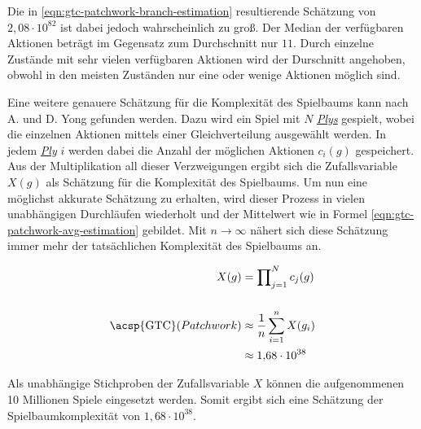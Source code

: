 Die in \ref{eqn:gtc-patchwork-branch-estimation} resultierende Schätzung von $2{,}08 \cdot 10^{82}$ ist dabei jedoch wahrscheinlich zu groß. Der Median der verfügbaren Aktionen beträgt im Gegensatz zum Durchschnitt nur $11$. Durch einzelne Zustände mit sehr vielen verfügbaren Aktionen wird der Durschnitt angehoben, obwohl in den meisten Zuständen nur eine oder wenige Aktionen möglich sind.

Eine weitere genauere Schätzung für die Komplexität des Spielbaums kann nach A. und D. Yong gefunden werden. Dazu wird ein Spiel mit $N$ \hyperref[text:ply]{\emph{Plys}} gespielt, wobei die einzelnen Aktionen mittels einer Gleichverteilung ausgewählt werden. In jedem \hyperref[text:ply]{\emph{Ply}} $i$ werden dabei die Anzahl der möglichen Aktionen $c_i(g)$ gespeichert. Aus der Multiplikation all dieser Verzweigungen ergibt sich die Zufallsvariable $X(g)$ als Schätzung für die Komplexität des Spielbaums. Um nun eine möglichst akkurate Schätzung zu erhalten, wird dieser Prozess in vielen unabhängigen Durchläufen wiederholt und der Mittelwert wie in Formel \ref{eqn:gtc-patchwork-avg-estimation} gebildet. Mit $n \to \infty$ nähert sich diese Schätzung immer mehr der tatsächlichen Komplexität des Spielbaums an. \cite{2019.GameTreeComplexityEstimation}

\begin{equation}
    \label{eqn:gtc-patchwork-avg-estimation}
    \begin{aligned}
        X(g)                         & = \prod\nolimits_{j=1}^{N} c_j(g)         \\[15pt]
        \text{\acsp{GTC}}(Patchwork) & \approx \frac{1}{n} \sum_{i=1}^{n} X(g_i) \\[1pt]
                                     & \approx 1{,}68 \cdot 10^{38}
    \end{aligned}
\end{equation}

Als unabhängige Stichproben der Zufallsvariable $X$ können die aufgenommenen 10 Millionen Spiele eingesetzt werden. Somit ergibt sich eine Schätzung der Spielbaumkomplexität von $1{,}68 \cdot 10^{38}$.
